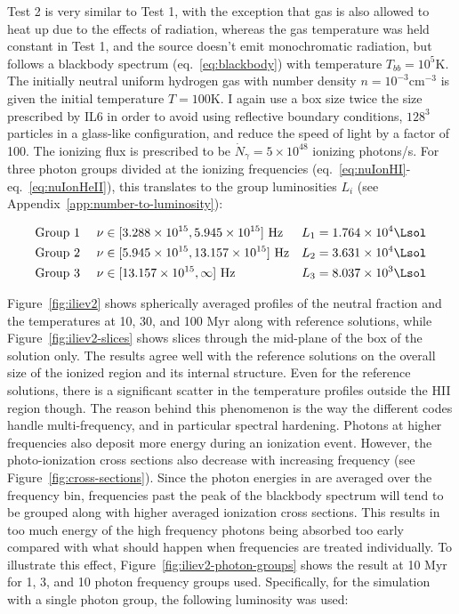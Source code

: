 Test 2 is very similar to Test 1, with the exception that gas is also allowed to heat up due to the
effects of radiation, whereas the gas temperature was held constant in Test 1, and the source
doesn't emit monochromatic radiation, but follows a blackbody spectrum (eq.~\ref{eq:blackbody}) with temperature $T_{bb} = 10^5$K. The initially neutral uniform hydrogen gas with number density $n = 10^{-3}$cm$^{-3}$ is given the initial temperature $T = 100$K. I again use a box size twice the size prescribed by IL6 in order to avoid using reflective boundary conditions, $128^3$ particles in a glass-like configuration, and reduce the speed of light by a factor of 100. The ionizing flux is prescribed to be $\dot{N}_\gamma = 5 \times 10^{48}$ ionizing photons/s. For three photon groups divided at the ionizing frequencies (eq.~\ref{eq:nuIonHI}-eq.~\ref{eq:nuIonHeII}), this translates to the group
luminosities $L_i$ (see Appendix~\ref{app:number-to-luminosity}):

\begin{align}
& \text{Group 1 } &&
    \nu \in [3.288\times 10^{15}, 5.945 \times 10^{15}] \text{ Hz} &&
    L_1 = 1.764 \times 10^4 \Lsol \label{eq:group-luminisoties-1} \\
& \text{Group 2 } &&
    \nu \in [5.945 \times 10^{15}, 13.157 \times 10^{15}] \text{ Hz} &&
    L_2 = 3.631 \times 10^4 \Lsol \\
& \text{Group 3 } &&
    \nu \in [13.157 \times 10^{15}, \infty] \text{ Hz} &&
    L_3 = 8.037 \times 10^3 \Lsol \label{eq:group-luminosities-3}
\end{align}


Figure~\ref{fig:iliev2} shows spherically averaged profiles of the neutral fraction and the
temperatures at 10, 30, and 100 Myr along with reference solutions, while
Figure~\ref{fig:iliev2-slices} shows slices through the mid-plane of the box of the \GEARRT solution
only. The results agree well with the reference solutions on the overall size of the ionized region
and its internal structure. Even for the reference solutions, there is a significant scatter in the
temperature profiles outside the HII region though. The reason behind this phenomenon is the way the
different codes handle multi-frequency, and in particular spectral hardening. Photons at higher
frequencies also deposit more energy during an ionization event. However, the photo-ionization cross
sections also decrease with increasing frequency (see Figure~\ref{fig:cross-sections}). Since the
photon energies in \GEARRT are averaged over the frequency bin, frequencies past the peak of the
blackbody spectrum will tend to be grouped along with higher averaged ionization cross sections.
This results in too much energy of the high frequency photons being absorbed too early compared with
what should happen when frequencies are treated individually. To illustrate this effect,
Figure~\ref{fig:iliev2-photon-groups} shows the result at 10 Myr for 1, 3, and 10 photon frequency
groups used. Specifically, for the simulation with a single photon group, the following luminosity
was used:


